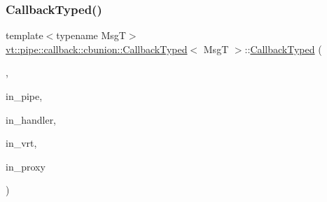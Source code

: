 \mbox{\label{structvt_1_1pipe_1_1callback_1_1cbunion_1_1_callback_typed_a740587b83455cae5c3a65bb26dd7e53c}} 
\subsubsection{\texorpdfstring{Callback\+Typed()}{CallbackTyped()}\hspace{0.1cm}{\footnotesize\ttfamily [9/14]}}
{\footnotesize\ttfamily template$<$typename MsgT$>$ \\
\hyperlink{structvt_1_1pipe_1_1callback_1_1cbunion_1_1_callback_typed}{vt\+::pipe\+::callback\+::cbunion\+::\+Callback\+Typed}$<$ MsgT $>$\+::\hyperlink{structvt_1_1pipe_1_1callback_1_1cbunion_1_1_callback_typed}{Callback\+Typed} (\begin{DoxyParamCaption}\item[{Raw\+Bcast\+Col\+Dir\+Tag\+Type}]{,  }\item[{\hyperlink{namespacevt_ac9852acda74d1896f48f406cd72c7bd3}{Pipe\+Type} const \&}]{in\+\_\+pipe,  }\item[{\hyperlink{namespacevt_af64846b57dfcaf104da3ef6967917573}{Handler\+Type} const}]{in\+\_\+handler,  }\item[{\hyperlink{structvt_1_1pipe_1_1callback_1_1cbunion_1_1_callback_raw_base_single_a734a9c83099de5bc1cd85f9da8dba7bb}{Auto\+Handler\+Type} const}]{in\+\_\+vrt,  }\item[{\hyperlink{namespacevt_a1b417dd5d684f045bb58a0ede70045ac}{Virtual\+Proxy\+Type} const \&}]{in\+\_\+proxy }\end{DoxyParamCaption})\hspace{0.3cm}{\ttfamily [inline]}}

\mbox{\label{structvt_1_1pipe_1_1callback_1_1cbunion_1_1_callback_typed_a4f4f239a8ab68f5f6ac6067df9af2995}} 
